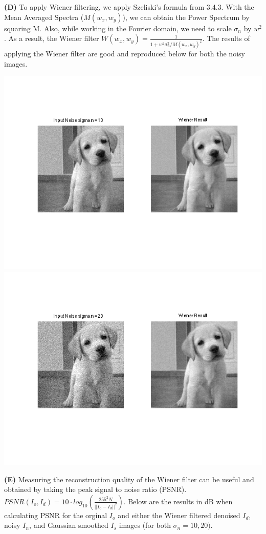 \documentclass[12pt,twoside]{article}
\newcommand{\tabUnit}{3ex}
\newcommand{\tabT}{\hspace*{\tabUnit}}
\begin{document}
\tabT \textbf{(D)}  To apply Wiener filtering, we apply Szeliski's formula from 3.4.3.  With the Mean Averaged Spectra ($M(w_x, w_y)$), we can obtain the Power Spectrum by squaring M.  Also, while working in the Fourier domain, we need to scale $\sigma_n$ by $w^{2}$.  As a result, the Wiener filter $W(w_x, w_y) = \frac{1}{1 + w^{2}\sigma_n^{2}/M(w_x,w_y)^{2}}$.  The results of applying the Wiener filter are good and reproduced below for both the noisy images.

\hspace{-70pt}
    \includegraphics[scale=.5]{W10} 
    \includegraphics[scale=.5]{W20} 

\tabT \textbf{(E)}  Measuring the reconstruction quality of the Wiener filter can be useful and obtained by taking the peak signal to noise ratio (PSNR).  $PSNR(I_o, I_d) = 10 \cdot log_{10}(\frac{255^{2}N}{{||I_o-I_d||}^2})$.  Below are the results in dB when calculating PSNR for the orginal $I_o$ and either the Wiener filtered denoised $I_d$, noisy $I_n$, and Gaussian smoothed $I_s$ images (for both $\sigma_n = 10,20)$.
\newline
\end{document}
